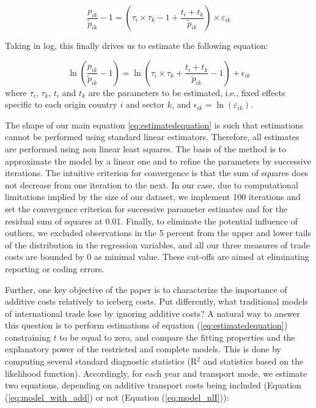 \documentclass[a4paper,11pt]{article}
\begin{document}
\begin{equation*}
\frac{p_{ik}}{\widetilde{p}_{ik}}-1 =\left(\tau_{i} \times \tau_{k} -1+\frac{t_{i} + t_{k}}{\widetilde{p}_{ik}} \right)\times \varepsilon_{ik}
\end{equation*}

Taking in log, this finally drives us to estimate the following equation:

\begin{equation}
\ln\left(\frac{p_{ik}}{\widetilde{p}_{ik}}-1 \right)= \ln \left(\tau_{i} \times \tau_{k}+\frac{t_{i} + t_{k}}{\widetilde{p}_{ik}}-1 \right) + \epsilon_{ik} \label{eq:estimatedequation}
\end{equation}
where $\tau_{i}$, $\tau_{k}$, $t_{i}$ and $t_{k}$ are the parameters to be estimated, i.e., fixed effects specific to each origin country $i$ and sector $k$, and $\epsilon_{ik}= \ln(\varepsilon_{ik})$.


The shape of our main equation \ref{eq:estimatedequation} is such that estimations cannot be performed using standard linear estimators. Therefore, all estimates are performed using non linear least squares. The basis of the method is to approximate the model by a linear one and to refine the parameters by successive iterations. The intuitive criterion for convergence is that the sum of squares does not decrease from one iteration to the next. In our case, due to computational limitations implied by the size of our dataset, we implement 100 iterations and set the convergence criterion for successive parameter estimates and for the residual sum of squares at 0.01. Finally, to eliminate the potential influence of outliers, we excluded observations in the 5 percent from the upper and lower tails of the distribution in the regression variables, and all our three measures of trade costs are bounded by 0 as minimal value. These cut-offs are aimed at eliminating reporting or coding errors.\medskip


Further, one key objective of the paper is to characterize the importance of additive costs relatively to iceberg costs. Put differently, what traditional models of international trade lose by ignoring additive costs? A natural way to answer this question is to perform estimations of equation (\ref{eq:estimatedequation}) constraining $t$ to be equal to zero, and compare the fitting properties and the explanatory power of the restricted and complete models. This is done by computing several standard diagnostic statistics (R$^{2}$ and statistics based on the likelihood function). Accordingly, for each year and transport mode, we estimate two equations, depending on additive transport costs being included (Equation (\ref{eq:model_with_add}) or not (Equation (\ref{eq:model_nlI})):
\end{document}
